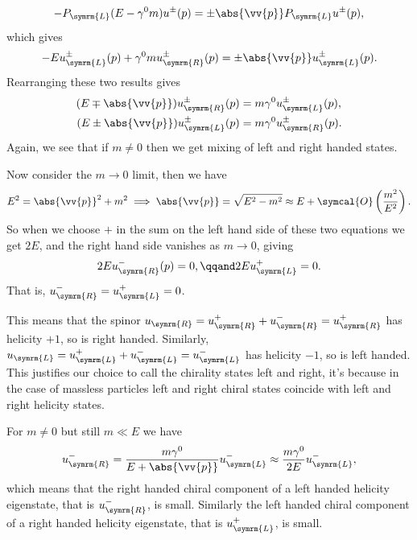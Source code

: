 \documentclass[fleqn]{NotesClass}
\newcommand{\order}{\symcal{O}}
\newcommand{\Left}{\symrm{L}}
\newcommand{\Right}{\symrm{R}}
\begin{document}
    \begin{equation}
        -P_{\Left}(E - \gamma^0m)u^{\pm}(p) = \pm\abs{\vv{p}}P_{\Left}u^{\pm}(p),
    \end{equation}
    which gives
    \begin{equation}
        -Eu^{\pm}_{\Left}(p) + \gamma^0mu^{\pm}_{\Right}(p) = \pm\abs{\vv{p}}u^{\pm}_{\Left}(p).
    \end{equation}
    Rearranging these two results gives
    \begin{align}
        (E \mp \abs{\vv{p}})u^{\pm}_{\Right}(p) &= m\gamma^0u^{\pm}_{\Left}(p),\\
        (E \pm \abs{\vv{p}})u^{\pm}_{\Left}(p) &= m\gamma^0u^{\pm}_{\Right}(p).
    \end{align}
    Again, we see that if \(m \ne 0\) then we get mixing of left and right handed states.
    
    Now consider the \(m \to 0\) limit, then we have
    \begin{equation}
        E^2 = \abs{\vv{p}}^2 + m^2 \implies \abs{\vv{p}} = \sqrt{E^2 - m^2} \approx E + \order\left( \frac{m^2}{E^2} \right).
    \end{equation}
    So when we choose \(+\) in the sum on the left hand side of these two equations we get \(2E\), and the right hand side vanishes as \(m \to 0\), giving
    \begin{equation}
        2Eu^{-}_{\Right}(p) = 0, \qqand 2Eu^{+}_{\Left} = 0.
    \end{equation}
    That is, \(u^{-}_{\Right} = u^{+}_{\Left} = 0\).
    
    This means that the spinor \(u_{\Right} = u^+_{\Right} + u^-_{\Right} = u^+_{\Right}\) has helicity \(+1\), so is right handed.
    Similarly, \(u_{\Left} = u^+_{\Left} + u^-_{\Left} = u^-_{\Left}\) has helicity \(-1\), so is left handed.
    This justifies our choice to call the chirality states left and right, it's because in the case of massless particles left and right chiral states coincide with left and right helicity states.
    
    For \(m \ne 0\) but still \(m \ll E\) we have
    \begin{equation}
        u^-_{\Right} = \frac{m\gamma^0}{E + \abs{\vv{p}}}u^-_{\Left} \approx \frac{m\gamma^0}{2E}u^-_{\Left},
    \end{equation}
    which means that the right handed chiral component of a left handed helicity eigenstate, that is \(u^-_{\Right}\), is small.
    Similarly the left handed chiral component of a right handed helicity eigenstate, that is \(u^+_{\Left}\), is small.
    
\end{document}

